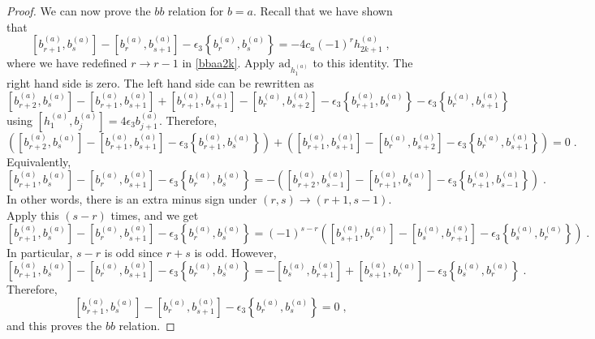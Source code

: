 \documentclass[11pt]{article}
\numberwithin{equation}{section}
\numberwithin{figure}{section}
\numberwithin{table}{section}
\begin{document}
\begin{proof}
We can now prove the $bb$ relation for $b=a$. Recall that we have shown that
\begin{equation}
	\left[b^{(a)}_{r+1},b^{(a)}_s\right]-\left[b^{(a)}_r,b^{(a)}_{s+1}\right]-\epsilon_3\left\{b^{(a)}_r,b^{(a)}_s\right\}=-4c_a(-1)^rh^{(a)}_{2k+1}\;,
\end{equation}
where we have redefined $r\rightarrow r-1$ in \eqref{bbaa2k}. Apply $\mathrm{ad}_{h^{(a)}_1}$ to this identity. The right hand side is zero. The left hand side can be rewritten as
\begin{equation}
	\left[b^{(a)}_{r+2},b^{(a)}_s\right]-\left[b^{(a)}_{r+1},b^{(a)}_{s+1}\right]+\left[b^{(a)}_{r+1},b^{(a)}_{s+1}\right]-\left[b^{(a)}_r,b^{(a)}_{s+2}\right]-\epsilon_3\left\{b^{(a)}_{r+1},b^{(a)}_s\right\}-\epsilon_3\left\{b^{(a)}_r,b^{(a)}_{s+1}\right\}
\end{equation}
using $\left[h^{(a)}_1,b^{(a)}_j\right]=4\epsilon_3b^{(a)}_{j+1}$. Therefore,
\begin{equation}
	\left(\left[b^{(a)}_{r+2},b^{(a)}_s\right]-\left[b^{(a)}_{r+1},b^{(a)}_{s+1}\right]-\epsilon_3\left\{b^{(a)}_{r+1},b^{(a)}_s\right\}\right)+\left(\left[b^{(a)}_{r+1},b^{(a)}_{s+1}\right]-\left[b^{(a)}_r,b^{(a)}_{s+2}\right]-\epsilon_3\left\{b^{(a)}_r,b^{(a)}_{s+1}\right\}\right)=0\;.
\end{equation}
Equivalently,
\begin{equation}
	\left[b^{(a)}_{r+1},b^{(a)}_s\right]-\left[b^{(a)}_r,b^{(a)}_{s+1}\right]-\epsilon_3\left\{b^{(a)}_r,b^{(a)}_s\right\}=-\left(\left[b^{(a)}_{r+2},b^{(a)}_{s-1}\right]-\left[b^{(a)}_{r+1},b^{(a)}_s\right]-\epsilon_3\left\{b^{(a)}_{r+1},b^{(a)}_{s-1}\right\}\right)\;.
\end{equation}
In other words, there is an extra minus sign under $(r,s)\rightarrow(r+1,s-1)$. Apply this $(s-r)$ times, and we get
\begin{equation}
	\left[b^{(a)}_{r+1},b^{(a)}_s\right]-\left[b^{(a)}_r,b^{(a)}_{s+1}\right]-\epsilon_3\left\{b^{(a)}_r,b^{(a)}_s\right\}=(-1)^{s-r}\left(\left[b^{(a)}_{s+1},b^{(a)}_r\right]-\left[b^{(a)}_s,b^{(a)}_{r+1}\right]-\epsilon_3\left\{b^{(a)}_s,b^{(a)}_r\right\}\right)\;.
\end{equation}
In particular, $s-r$ is odd since $r+s$ is odd. However,
\begin{equation}
	\left[b^{(a)}_{r+1},b^{(a)}_s\right]-\left[b^{(a)}_r,b^{(a)}_{s+1}\right]-\epsilon_3\left\{b^{(a)}_r,b^{(a)}_s\right\}=-\left[b^{(a)}_s,b^{(a)}_{r+1}\right]+\left[b^{(a)}_{s+1},b^{(a)}_r\right]-\epsilon_3\left\{b^{(a)}_s,b^{(a)}_r\right\}\;.
\end{equation}
Therefore,
\begin{equation}
	\left[b^{(a)}_{r+1},b^{(a)}_s\right]-\left[b^{(a)}_r,b^{(a)}_{s+1}\right]-\epsilon_3\left\{b^{(a)}_r,b^{(a)}_s\right\}=0\;,
\end{equation}
and this proves the $bb$ relation.


\end{proof}
\end{document}
